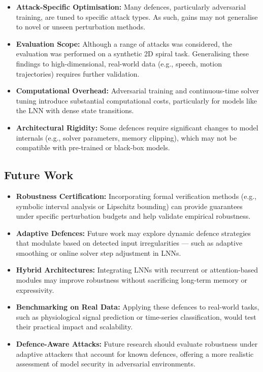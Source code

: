 \begin{itemize}
    \item \textbf{Attack-Specific Optimisation:} Many defences, particularly adversarial training, are tuned to specific attack types. As such, gains may not generalise to novel or unseen perturbation methods.
    
    \item \textbf{Evaluation Scope:} Although a range of attacks was considered, the evaluation was performed on a synthetic 2D spiral task. Generalising these findings to high-dimensional, real-world data (e.g., speech, motion trajectories) requires further validation.

    \item \textbf{Computational Overhead:} Adversarial training and continuous-time solver tuning introduce substantial computational costs, particularly for models like the LNN with dense state transitions.

    \item \textbf{Architectural Rigidity:} Some defences require significant changes to model internals (e.g., solver parameters, memory clipping), which may not be compatible with pre-trained or black-box models.
\end{itemize}

\subsection{Future Work}

\begin{itemize}
    \item \textbf{Robustness Certification:} Incorporating formal verification methods (e.g., symbolic interval analysis or Lipschitz bounding) can provide guarantees under specific perturbation budgets and help validate empirical robustness.

    \item \textbf{Adaptive Defences:} Future work may explore dynamic defence strategies that modulate based on detected input irregularities — such as adaptive smoothing or online solver step adjustment in LNNs.

    \item \textbf{Hybrid Architectures:} Integrating LNNs with recurrent or attention-based modules may improve robustness without sacrificing long-term memory or expressivity.

    \item \textbf{Benchmarking on Real Data:} Applying these defences to real-world tasks, such as physiological signal prediction or time-series classification, would test their practical impact and scalability.

    \item \textbf{Defence-Aware Attacks:} Future research should evaluate robustness under adaptive attackers that account for known defences, offering a more realistic assessment of model security in adversarial environments.
\end{itemize}

